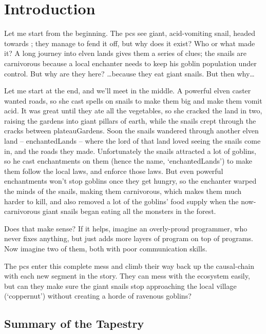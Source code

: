 \section{Introduction}

\begin{multicols}{2}

\noindent
Let me start from the beginning.
The \glspl{pc} see giant, acid-vomiting snail, headed towards ; they manage to fend it off, but why does it exist?
Who or what made it?
A long journey into elven lands gives them a series of clues; the snails are carnivorous because a local enchanter needs to keep his goblin population under control.
But why are they here?
\ldots because they eat giant snails.
But then why\ldots

Let me start at the end, and we'll meet in the middle.
A powerful elven caster wanted roads, so she cast spells on snails to make them big and make them vomit acid.
It was great until they ate all the vegetables, so she cracked the land in two, raising the gardens into giant pillars of earth, while the snails crept through the cracks between \gls{plateauGardens}.
Soon the snails wandered through another elven land -- \gls{enchantedLands} -- where the lord of that land loved seeing the snails come in, and the roads they made.
Unfortunately the snails attracted a lot of goblins, so he cast enchantments on them (hence the name, `\gls{enchantedLands}') to make them follow the local laws, and enforce those laws.
But even powerful enchantments won't stop goblins once they get hungry, so the enchanter warped the minds of the snails, making them carnivorous, which makes them much harder to kill, and also removed a lot of the goblins' food supply when the now-carnivorous giant snails began eating all the \glspl{monster} in the forest.

Does that make sense?
If it helps, imagine an overly-proud programmer, who never fixes anything, but just adds more layers of program on top of programs.
Now imagine two of them, both with poor communication skills.

The \glspl{pc} enter this complete mess and climb their way back up the causal-chain with each new \gls{segment} in the story.
They can mess with the ecosystem easily, but can they make sure the giant snails stop approaching the local \gls{village} (`\gls{coppernut}') without creating a horde of ravenous goblins?

\subsection{Summary of the Tapestry}


\end{multicols}
